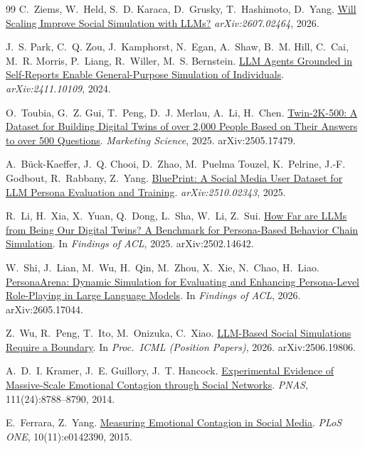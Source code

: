 \documentclass[twocolumn,10pt]{article}
\makeatletter
\newcommand{\paperurlof}[1]{\csname paperurl@#1\endcsname}
\newcommand{\reftitle}[2]{\href{\paperurlof{#1}}{#2}}
\makeatother
\begin{document}
\begin{thebibliography}{99}
C.~Ziems, W.~Held, S.~D. Karaca, D.~Grusky, T.~Hashimoto, D.~Yang.
\newblock \reftitle{scaling}{Will Scaling Improve Social Simulation with
LLMs?}
\newblock \emph{arXiv:2607.02464}, 2026.

J.~S. Park, C.~Q. Zou, J.~Kamphorst, N.~Egan, A.~Shaw, B.~M. Hill, C.~Cai,
M.~R. Morris, P.~Liang, R.~Willer, M.~S. Bernstein.
\newblock \reftitle{park2024}{LLM Agents Grounded in Self-Reports Enable
General-Purpose Simulation of Individuals}.
\newblock \emph{arXiv:2411.10109}, 2024.

O.~Toubia, G.~Z. Gui, T.~Peng, D.~J. Merlau, A.~Li, H.~Chen.
\newblock \reftitle{twin2k}{Twin-2K-500: A Dataset for Building Digital Twins
of over 2,000 People Based on Their Answers to over 500 Questions}.
\newblock \emph{Marketing Science}, 2025. arXiv:2505.17479.

A.~B\"uck-Kaeffer, J.~Q. Chooi, D.~Zhao, M.~Puelma Touzel, K.~Pelrine,
J.-F. Godbout, R.~Rabbany, Z.~Yang.
\newblock \reftitle{blueprint}{BluePrint: A Social Media User Dataset for
LLM Persona Evaluation and Training}.
\newblock \emph{arXiv:2510.02343}, 2025.

R.~Li, H.~Xia, X.~Yuan, Q.~Dong, L.~Sha, W.~Li, Z.~Sui.
\newblock \reftitle{behaviorchain}{How Far are LLMs from Being Our Digital
Twins? A Benchmark for Persona-Based Behavior Chain Simulation}.
\newblock In \emph{Findings of ACL}, 2025. arXiv:2502.14642.

W.~Shi, J.~Lian, M.~Wu, H.~Qin, M.~Zhou, X.~Xie, N.~Chao, H.~Liao.
\newblock \reftitle{personaarena}{PersonaArena: Dynamic Simulation for
Evaluating and Enhancing Persona-Level Role-Playing in Large Language
Models}.
\newblock In \emph{Findings of ACL}, 2026. arXiv:2605.17044.

Z.~Wu, R.~Peng, T.~Ito, M.~Onizuka, C.~Xiao.
\newblock \reftitle{boundary}{LLM-Based Social Simulations Require a
Boundary}.
\newblock In \emph{Proc.\ ICML (Position Papers)}, 2026. arXiv:2506.19806.

A.~D.~I. Kramer, J.~E. Guillory, J.~T. Hancock.
\newblock \reftitle{kramer2014}{Experimental Evidence of Massive-Scale
Emotional Contagion through Social Networks}.
\newblock \emph{PNAS}, 111(24):8788--8790, 2014.

E.~Ferrara, Z.~Yang.
\newblock \reftitle{ferrara2015}{Measuring Emotional Contagion in Social
Media}.
\newblock \emph{PLoS ONE}, 10(11):e0142390, 2015.


\end{thebibliography}
\end{document}
